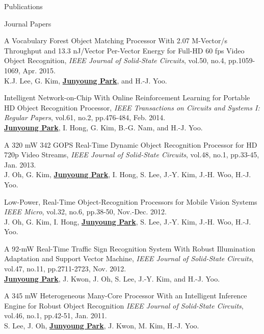 \documentclass{resume} %
\begin{document}
\begin{section}{Publications}

\begin{subsection}{Journal Papers}{}{}{}

\item A Vocabulary Forest Object Matching Processor With 2.07 M-Vector/s Throughput and 13.3 nJ/Vector Per-Vector Energy for Full-HD 60 fps Video Object Recognition, \emph{IEEE Journal of Solid-State Circuits}, vol.50, no.4, pp.1059-1069, Apr. 2015. \\
K.J. Lee, G. Kim, \underline{\bf Junyoung Park}, and H.-J. Yoo.

\item Intelligent Network-on-Chip With Online Reinforcement Learning for Portable HD Object Recognition Processor, \emph{IEEE Transactions on Circuits and Systems I: Regular Papers}, vol.61, no.2, pp.476-484, Feb. 2014. \\
\underline{\bf Junyoung Park}, I. Hong, G. Kim, B.-G. Nam, and H.-J. Yoo.

\item A 320 mW 342 GOPS Real-Time Dynamic Object Recognition Processor for HD 720p Video Streams, \emph{IEEE Journal of Solid-State Circuits}, vol.48, no.1, pp.33-45, Jan. 2013. \\
J. Oh, G. Kim, \underline{\bf Junyoung Park}, I. Hong, S. Lee, J.-Y. Kim, J.-H. Woo, H.-J. Yoo.

\item Low-Power, Real-Time Object-Recognition Processors for Mobile Vision Systems \emph{IEEE Micro}, vol.32, no.6, pp.38-50, Nov.-Dec. 2012. \\
J. Oh, G. Kim, I. Hong, \underline{\bf Junyoung Park}, S. Lee, J.-Y. Kim, J.-H. Woo, H.-J. Yoo.

\item A 92-mW Real-Time Traffic Sign Recognition System With Robust Illumination Adaptation and Support Vector Machine, \emph{IEEE Journal of Solid-State Circuits}, vol.47, no.11, pp.2711-2723, Nov. 2012. \\
\underline{\bf Junyoung Park}, J. Kwon, J. Oh, S. Lee, J.-Y. Kim, and H.-J. Yoo.

\item A 345 mW Heterogeneous Many-Core Processor With an Intelligent Inference Engine for Robust Object Recognition \emph{IEEE Journal of Solid-State Circuits}, vol.46, no.1, pp.42-51, Jan. 2011. \\
S. Lee, J. Oh, \underline{\bf Junyoung Park}, J. Kwon, M. Kim, H.-J. Yoo.


\end{subsection}
\end{section}
\end{document}
